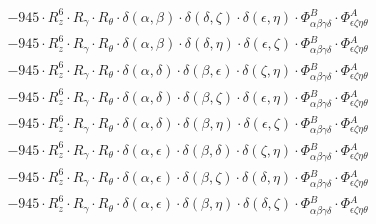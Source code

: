 \documentclass{article}
\begin{document}
\begin{equation}
\begin{array}{c}
 \\[0.2em] 		 - 945 \cdot R_{z}^{6} \cdot R_{\gamma{}} \cdot R_{\theta{}} \cdot \delta{}\left(\alpha{}, \beta{}\right) \cdot \delta{}\left(\delta{}, \zeta{}\right) \cdot \delta{}\left(\epsilon{}, \eta{}\right) \cdot \Phi{}^{B}_{\alpha{}\beta{}\gamma{}\delta{}} \cdot \Phi{}^{A}_{\epsilon{}\zeta{}\eta{}\theta{}} 
 \\[0.2em] 		 - 945 \cdot R_{z}^{6} \cdot R_{\gamma{}} \cdot R_{\theta{}} \cdot \delta{}\left(\alpha{}, \beta{}\right) \cdot \delta{}\left(\delta{}, \eta{}\right) \cdot \delta{}\left(\epsilon{}, \zeta{}\right) \cdot \Phi{}^{B}_{\alpha{}\beta{}\gamma{}\delta{}} \cdot \Phi{}^{A}_{\epsilon{}\zeta{}\eta{}\theta{}} 
 \\[0.2em] 		 - 945 \cdot R_{z}^{6} \cdot R_{\gamma{}} \cdot R_{\theta{}} \cdot \delta{}\left(\alpha{}, \delta{}\right) \cdot \delta{}\left(\beta{}, \epsilon{}\right) \cdot \delta{}\left(\zeta{}, \eta{}\right) \cdot \Phi{}^{B}_{\alpha{}\beta{}\gamma{}\delta{}} \cdot \Phi{}^{A}_{\epsilon{}\zeta{}\eta{}\theta{}} 
 \\[0.2em] 		 - 945 \cdot R_{z}^{6} \cdot R_{\gamma{}} \cdot R_{\theta{}} \cdot \delta{}\left(\alpha{}, \delta{}\right) \cdot \delta{}\left(\beta{}, \zeta{}\right) \cdot \delta{}\left(\epsilon{}, \eta{}\right) \cdot \Phi{}^{B}_{\alpha{}\beta{}\gamma{}\delta{}} \cdot \Phi{}^{A}_{\epsilon{}\zeta{}\eta{}\theta{}} 
 \\[0.2em] 		 - 945 \cdot R_{z}^{6} \cdot R_{\gamma{}} \cdot R_{\theta{}} \cdot \delta{}\left(\alpha{}, \delta{}\right) \cdot \delta{}\left(\beta{}, \eta{}\right) \cdot \delta{}\left(\epsilon{}, \zeta{}\right) \cdot \Phi{}^{B}_{\alpha{}\beta{}\gamma{}\delta{}} \cdot \Phi{}^{A}_{\epsilon{}\zeta{}\eta{}\theta{}} 
 \\[0.2em] 		 - 945 \cdot R_{z}^{6} \cdot R_{\gamma{}} \cdot R_{\theta{}} \cdot \delta{}\left(\alpha{}, \epsilon{}\right) \cdot \delta{}\left(\beta{}, \delta{}\right) \cdot \delta{}\left(\zeta{}, \eta{}\right) \cdot \Phi{}^{B}_{\alpha{}\beta{}\gamma{}\delta{}} \cdot \Phi{}^{A}_{\epsilon{}\zeta{}\eta{}\theta{}} 
 \\[0.2em] 		 - 945 \cdot R_{z}^{6} \cdot R_{\gamma{}} \cdot R_{\theta{}} \cdot \delta{}\left(\alpha{}, \epsilon{}\right) \cdot \delta{}\left(\beta{}, \zeta{}\right) \cdot \delta{}\left(\delta{}, \eta{}\right) \cdot \Phi{}^{B}_{\alpha{}\beta{}\gamma{}\delta{}} \cdot \Phi{}^{A}_{\epsilon{}\zeta{}\eta{}\theta{}} 
 \\[0.2em] 		 - 945 \cdot R_{z}^{6} \cdot R_{\gamma{}} \cdot R_{\theta{}} \cdot \delta{}\left(\alpha{}, \epsilon{}\right) \cdot \delta{}\left(\beta{}, \eta{}\right) \cdot \delta{}\left(\delta{}, \zeta{}\right) \cdot \Phi{}^{B}_{\alpha{}\beta{}\gamma{}\delta{}} \cdot \Phi{}^{A}_{\epsilon{}\zeta{}\eta{}\theta{}} 

\end{array}
\end{equation}
\end{document}
